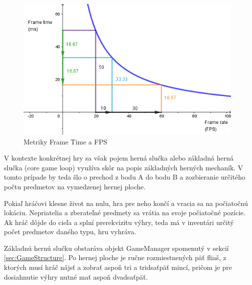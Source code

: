 \documentclass[slovak, master]{diploma}
\begin{document}
\begin{figure}[!htbp]
	\centering
	\includegraphics[width=.8\textwidth]{Figures/frameTimeVsFPS.png}
	\caption{Metriky Frame Time a FPS \cite{FrameTimeFPS}}
	\label{pic:FrameTimeFPS}
\end{figure}

V kontexte konkrétnej hry sa však pojem herná slučka alebo základná herná slučka (core game loop) využíva skôr na popis základných herných mechaník. V tomto prípade by teda šlo o prechod z bodu A do bodu B a zozbieranie určitého počtu predmetov na vymedzenej hernej ploche.

Pokiaľ hráčovi klesne život na nulu, hra pre neho končí a vracia sa na počiatočnú lokáciu. Nepriatelia a zberateľné predmety sa vrátia na svoje počiatočné pozície. Ak hráč dôjde do cieľa a splní prerekvizitu výhry, teda má v inventári určitý počet predmetov daného typu, hru vyhráva. 

Základnú hernú slučku obstaráva objekt GameManager spomenutý v sekcií \ref{sec:GameStructure}. Po hernej ploche je ručne rozmiestnených päť fliaš, z ktorých musí hráč nájsť a zobrať aspoň tri a tridsaťpäť mincí, pričom je pre dosiahnutie výhry nutné mať aspoň dvadsaťpäť. 
\end{document}
